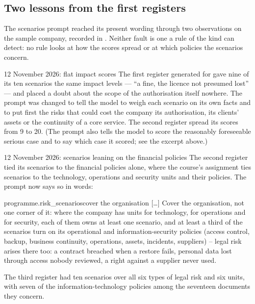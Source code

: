 \subsection{Two lessons from the first registers}

The scenarios prompt reached its present wording through two observations on the sample
company, recorded in . Neither fault is one a rule of the kind can
detect: no rule looks at how the scores spread or at which policies the scenarios concern.

\begin{lessonbox}{12 November 2026: flat impact scores}
The first register generated for \demo{} gave nine of its ten scenarios the same impact
levels --- \enquote{a fine, the licence not presumed lost} --- and placed a doubt about the
scope of the authorisation itself nowhere. The prompt was changed to tell the model to weigh
each scenario on its own facts and to put first the risks that could cost the company its
authorisation, its clients' assets or the continuity of a core service. The second register
spread its scores from 9 to 20. (The prompt also tells the model to score the reasonably
foreseeable serious case and to say which case it scored; see the excerpt above.)
\end{lessonbox}

\begin{lessonbox}{12 November 2026: scenarios leaning on the financial policies}
The second register tied its scenarios to the financial policies alone, where the course's
assignment ties scenarios to the technology, operations and security units and their
policies. The prompt now says so in words:

\begin{promptexcerpt}{programme.risk_scenarios}{cover the organisation}
[…]
Cover the organisation, not one corner of it: where the company has units for technology, for operations and for security, each of them owns at least one scenario, and at least a third of the scenarios turn on its operational and information-security policies (access control, backup, business continuity, operations, assets, incidents, suppliers) – legal risk arises there too: a contract breached when a restore fails, personal data lost through access nobody reviewed, a right against a supplier never used.
\end{promptexcerpt}

The third register had ten scenarios over all six types of legal risk and six units, with
seven of the information-technology policies among the seventeen documents they concern.
\end{lessonbox}


